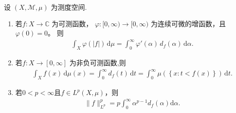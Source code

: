 \documentclass[../../main.tex]{subfiles}%
\begin{document}
\begin{proposition}\label{proposition:广义层饼表示(Generalized Layer-Cake Representation)}
设 $(X,\mathscr{M},\mu)$ 为测度空间.
\begin{enumerate}[(1)]
\item 若$f:X\to \mathbb{C}$ 为可测函数，
$\varphi:[0,\infty)\to[0,\infty)$ 为连续可微的增函数，且 $\varphi(0)=0$。
则
\begin{align}\label{eq::::UHFUHEWUHUIOJIWJIJJIJIIJII}
\int_X \varphi(|f|)\,\mathrm{d}\mu
=
\int_0^\infty \varphi'(\alpha)\,d_f(\alpha)\,\mathrm{d}\alpha.
\end{align}

\item 若$f:X\to[0,\infty]$ 为非负可测函数,则
\begin{align*}
\int_X f(x)\,\mathrm{d}\mu(x)=\int_0^{\infty}{d_f\left( t \right) \,\mathrm{d}t}=\int_0^{\infty}{\mu \left( \left\{ x:t<f\left( x \right) \right\} \right) \,\mathrm{d}t}.
\end{align*}

\item 若$0<p<\infty$且$f\in L^p(X,\mu)$，则
\begin{align}
\|f\|_{L^p}^p = p\int_{0}^{\infty}\alpha^{p-1}d_f(\alpha)\mathrm{d}\alpha.
\label{eq:lp-dist-representation}
\end{align}
\end{enumerate}
\end{proposition}
\end{document}
